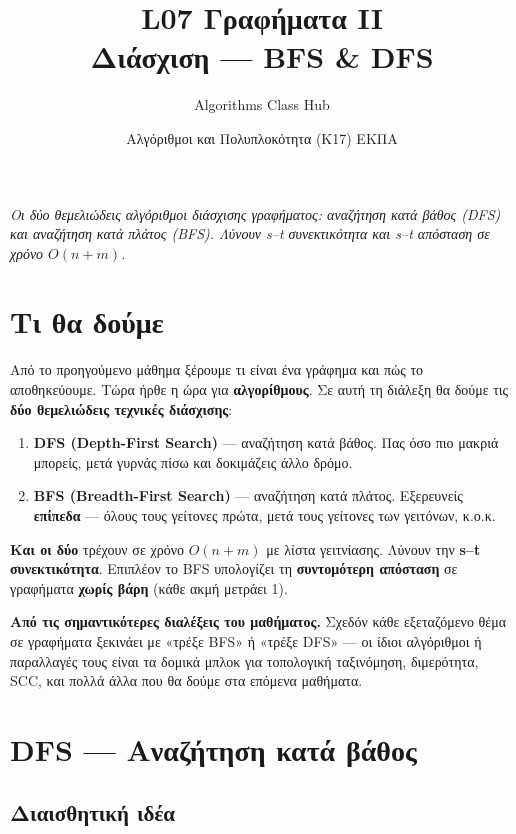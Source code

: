 \documentclass[11pt,a4paper]{article}
\title{\textbf{L07 \textperiodcentered{} Γραφήματα II}\\[2pt]
\large Διάσχιση --- BFS \& DFS}
\author{Algorithms Class Hub}
\date{\small Αλγόριθμοι και Πολυπλοκότητα (K17) \textperiodcentered{} ΕΚΠΑ}
\begin{document}
\maketitle

\begin{center}\itshape\small
Οι δύο θεμελιώδεις αλγόριθμοι διάσχισης γραφήματος: αναζήτηση κατά βάθος (DFS)
και αναζήτηση κατά πλάτος (BFS). Λύνουν s--t συνεκτικότητα και s--t απόσταση σε
χρόνο $O(n+m)$.
\end{center}

\section{Τι θα δούμε}

Από το προηγούμενο μάθημα ξέρουμε τι είναι ένα γράφημα και πώς το αποθηκεύουμε.
Τώρα ήρθε η ώρα για \textbf{αλγορίθμους}. Σε αυτή τη διάλεξη θα δούμε τις
\textbf{δύο θεμελιώδεις τεχνικές διάσχισης}:
\begin{enumerate}
  \item \textbf{DFS (Depth-First Search)} --- αναζήτηση κατά βάθος. Πας όσο πιο
  μακριά μπορείς, μετά γυρνάς πίσω και δοκιμάζεις άλλο δρόμο.
  \item \textbf{BFS (Breadth-First Search)} --- αναζήτηση κατά πλάτος.
  Εξερευνείς \textbf{επίπεδα} --- όλους τους γείτονες πρώτα, μετά τους γείτονες
  των γειτόνων, κ.ο.κ.
\end{enumerate}

\textbf{Και οι δύο} τρέχουν σε χρόνο $O(n + m)$ με λίστα γειτνίασης. Λύνουν την
\textbf{s--t συνεκτικότητα}. Επιπλέον το BFS υπολογίζει τη \textbf{συντομότερη
απόσταση} σε γραφήματα \textbf{χωρίς βάρη} (κάθε ακμή μετράει 1).

\begin{keypoint}
\textbf{Από τις σημαντικότερες διαλέξεις του μαθήματος.} Σχεδόν κάθε εξεταζόμενο
θέμα σε γραφήματα ξεκινάει με «τρέξε BFS» ή «τρέξε DFS» --- οι ίδιοι αλγόριθμοι ή
παραλλαγές τους είναι τα δομικά μπλοκ για τοπολογική ταξινόμηση, διμερότητα, SCC,
και πολλά άλλα που θα δούμε στα επόμενα μαθήματα.
\end{keypoint}

\section{DFS --- Αναζήτηση κατά βάθος}

\subsection{Διαισθητική ιδέα}
\end{document}
